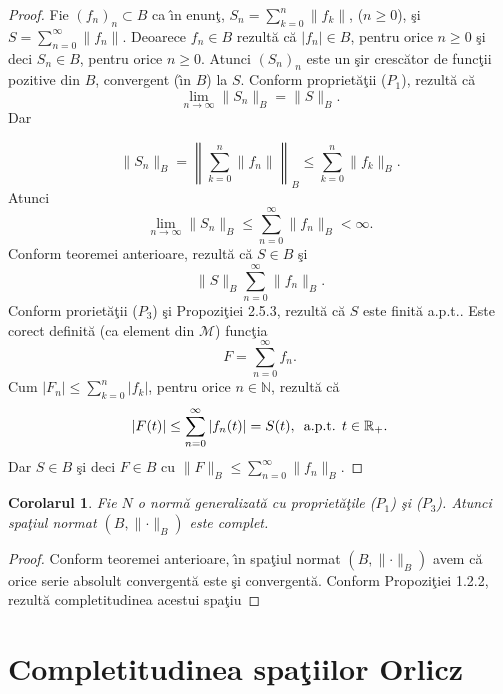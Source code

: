 \documentclass[ a4paper, 12pt]{report}
\newtheorem{cor}[theorem]{\bf Corolarul}
\theoremstyle{definition}
\theoremstyle{remark}
\numberwithin{equation}{section}
\begin{document}
\begin{proof} Fie $(f_n)_n \subset B$ ca \^\i n enun\c t, $S_n = \sum\limits_{k = 0}^n \lVert f_k \rVert$, ($n \geq 0$), \c si $S = \sum\limits_{n = 0}^\infty \lVert f_n \rVert$. Deoarece $f_n \in B$ rezult\u a c\u a $\lvert f_n \rvert \in B$, pentru orice $n \geq 0$ \c si deci $S_n \in B$, pentru orice $n \geq 0$. Atunci $(S_n)_n$ este un \c sir cresc\u ator de func\c tii pozitive din $B$, convergent (\^\i n $B$)  la $S$. Conform propriet\u a\c tii ($P_1$), rezult\u  a c\u a
$$\lim\limits_{ n \to \infty} \lVert S_n \rVert_B =  \lVert S \rVert_B.$$ Dar

$$\lVert S_n \rVert_B =\left \lVert \sum\limits_{k = 0}^n \lVert f_n \rVert \right\rVert_B \leq \sum\limits_{k = 0}^n \lVert f_k \rVert_B.$$ Atunci
$$\lim\limits_{n \to \infty}\lVert S_n \rVert_B  \leq \sum\limits_{n = 0}^\infty \lVert f_n \rVert_B < \infty.$$ Conform teoremei anterioare, rezult\u a c\u a $S \in B$ \c si
$$\lVert S \rVert_B \sum\limits_{n = 0}^\infty \lVert f_n \rVert_B.$$ Conform proriet\u a\c tii ($P_3$) \c si Propozi\c tiei 2.5.3, rezult\u a  c\u a $S$ este finit\u a a.p.t.. Este corect definit\u a  (ca element din $\mathcal{M}$) func\c tia
$$F = \sum\limits_{n = 0}^\infty f_n.$$
Cum $|F_n| \leq \sum\limits_{k = 0}^n |f_k|$, pentru orice $n \in \mathbb{N}$, rezult\u a c\u a
$$|F(t)| \leq \sum\limits_{n = 0}^\infty |f_n(t)| = S(t),\, \hbox{ a.p.t. } t \in \mathbb{R}_+.$$
Dar $S \in B$ \c si deci $F \in B$ cu $\lVert F\rVert_B \leq \sum\limits_{n = 0}^\infty \lVert f_n \rVert_B$.
\end{proof}

\begin{cor}
Fie $N$ o norm\u a generalizat\u a cu propriet\u a\c tile ($P_1$) \c si ($P_3$). Atunci spa\c tiul normat $(B, \lVert\cdot \rVert_B)$ este complet.
\end{cor}

\begin{proof}
Conform teoremei anterioare, \^\i n spa\c tiul normat $(B, \lVert\cdot \rVert_B)$ avem c\u a orice serie absolult convergent\u a este \c si convergent\u a. Conform Propozi\c tiei 1.2.2, rezult\u a completitudinea acestui spa\c tiu
\end{proof}


\newpage

\section{Completitudinea spa\c tiilor Orlicz}
\end{document}
